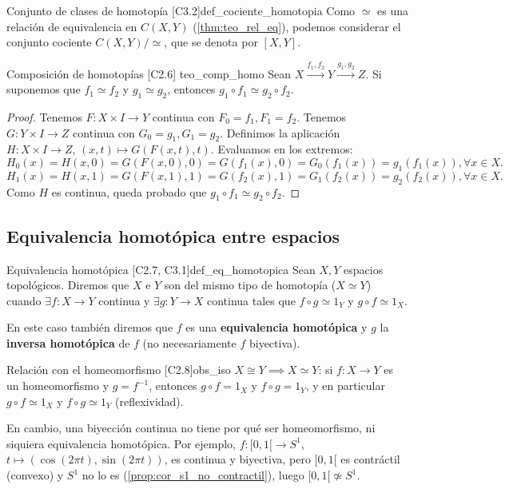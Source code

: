 \begin{definicion}{Conjunto de clases de homotopía [C3.2]}{def_cociente_homotopia}
Como $\simeq$ es una relación de equivalencia en $C(X,Y)$ (\cref{thm:teo_rel_eq}), podemos considerar el conjunto cociente $C(X,Y)/\simeq$, que se denota por $[X,Y]$.
\end{definicion}

\begin{teorema}{Composición de homotopías [C2.6] \marcaT}{teo_comp_homo}
Sean $X \xrightarrow{f_1, f_2} Y \xrightarrow{g_1, g_2} Z$. Si suponemos que $f_1 \simeq f_2$ y $g_1 \simeq g_2$, entonces $g_1 \circ f_1 \simeq g_2 \circ f_2$.
\end{teorema}

\begin{proof}
Tenemos $F \colon X \times I \to Y$ continua con $F_0=f_1, F_1=f_2$.
Tenemos $G \colon Y \times I \to Z$ continua con $G_0=g_1, G_1=g_2$.
Definimos la aplicación $H \colon X \times I \to Z$, $(x,t) \mapsto G(F(x,t), t)$. Evaluamos en los extremos:
\[ H_0(x) = H(x,0) = G(F(x,0), 0) = G(f_1(x), 0) = G_0(f_1(x)) = g_1(f_1(x)), \forall x \in X. \]
\[ H_1(x) = H(x,1) = G(F(x,1), 1) = G(f_2(x), 1) = G_1(f_2(x)) = g_2(f_2(x)), \forall x \in X. \]
Como $H$ es continua, queda probado que $g_1 \circ f_1 \simeq g_2 \circ f_2$.
\end{proof}


\subsection{Equivalencia homotópica entre espacios}

\begin{definicion}{Equivalencia homotópica [C2.7, C3.1]}{def_eq_homotopica}
Sean $X, Y$ espacios topológicos. Diremos que $X$ e $Y$ son del mismo tipo de homotopía ($X \simeq Y$) cuando $\exists f \colon X \to Y$ continua y $\exists g \colon Y \to X$ continua tales que $f \circ g \simeq 1_Y$ y $g \circ f \simeq 1_X$. 

En este caso también diremos que $f$ es una \textbf{equivalencia homotópica} y $g$ la \textbf{inversa homotópica} de $f$ (no necesariamente $f$ biyectiva).
\end{definicion}

\begin{observacion}{Relación con el homeomorfismo [C2.8]}{obs_iso}
$X \cong Y \implies X \simeq Y$: si $f \colon X \to Y$ es un homeomorfismo y $g = f^{-1}$, entonces $g \circ f = 1_X$ y $f \circ g = 1_Y$, y en particular $g \circ f \simeq 1_X$ y $f \circ g \simeq 1_Y$ (reflexividad).

En cambio, una biyección continua no tiene por qué ser homeomorfismo, ni siquiera equivalencia homotópica. Por ejemplo, $f \colon [0, 1[ \to S^1$, $t \mapsto (\cos(2\pi t), \sin(2\pi t))$, es continua y biyectiva, pero $[0,1[$ es contráctil (convexo) y $S^1$ no lo es (\cref{prop:cor_s1_no_contractil}), luego $[0,1[ \not\simeq S^1$.
\end{observacion}

